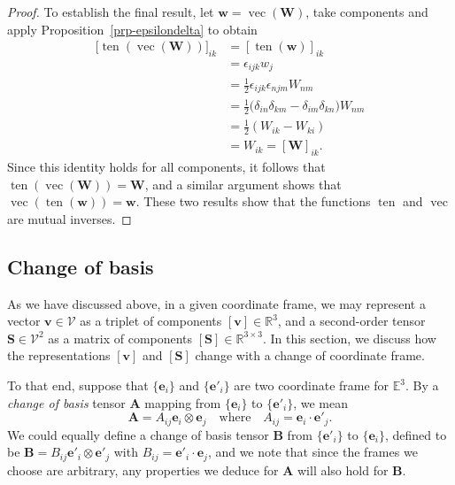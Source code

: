 \documentclass[
  letterpaper,
  DIV=11,
  numbers=noendperiod]{scrreprt}
\theoremstyle{plain}
\theoremstyle{remark}
\begin{document}
\begin{proof}
To establish the final result, let
\({\boldsymbol{w}}= {\operatorname{vec}}({\boldsymbol{W}})\), take
components and apply Proposition~\ref{prp-epsilondelta} to obtain
\begin{align*}
    \big[{\operatorname{ten}}({\operatorname{vec}}({\boldsymbol{W}}))\big]_{ik}
    &= [{\operatorname{ten}}({\boldsymbol{w}})]_{ik}\\
    &= \epsilon_{ijk}w_j\\
    &=\tfrac12\epsilon_{ijk}\epsilon_{njm}W_{nm}\\
    &=\tfrac12\big(\delta_{in}\delta_{km}-\delta_{im}\delta_{kn}\big)W_{nm}\\
    &=\tfrac12 (W_{ik}-W_{ki})\\
    &=W_{ik} = [{\boldsymbol{W}}]_{ik}.
\end{align*} Since this identity holds for all components, it follows
that
\({\operatorname{ten}}({\operatorname{vec}}({\boldsymbol{W}}))={\boldsymbol{W}}\),
and a similar argument shows that
\({\operatorname{vec}}({\operatorname{ten}}({\boldsymbol{w}}))={\boldsymbol{w}}\).
These two results show that the functions \({\operatorname{ten}}\) and
\({\operatorname{vec}}\) are mutual inverses.
\end{proof}

\subsection{Change of basis}\label{change-of-basis}

As we have discussed above, in a given coordinate frame, we may
represent a vector \({\boldsymbol{v}}\in{\mathcal{V}}\) as a triplet of
components \([{\boldsymbol{v}}]\in{\mathbb{R}}^3\), and a second-order
tensor \({\boldsymbol{S}}\in{\mathcal{V}}^2\) as a matrix of components
\([{\boldsymbol{S}}]\in{\mathbb{R}}^{3\times 3}\). In this section, we
discuss how the representations \([{\boldsymbol{v}}]\) and
\([{\boldsymbol{S}}]\) change with a change of coordinate frame.

To that end, suppose that \(\{{\boldsymbol{e}}_i\}\) and
\(\{{\boldsymbol{e}}'_i\}\) are two coordinate frame for
\({\mathbb{E}}^3\). By a \emph{change of basis} tensor
\({\boldsymbol{A}}\) mapping from \(\{{\boldsymbol{e}}_i\}\) to
\(\{{\boldsymbol{e}}'_i\}\), we mean
\[{\boldsymbol{A}}= A_{ij}{\boldsymbol{e}}_i\otimes {\boldsymbol{e}}_j\quad\text{where}\quad A_{ij} = {\boldsymbol{e}}_i\cdot{\boldsymbol{e}}'_j.\]
We could equally define a change of basis tensor \({\boldsymbol{B}}\)
from \(\{{\boldsymbol{e}}'_i\}\) to \(\{{\boldsymbol{e}}_i\}\), defined
to be
\({\boldsymbol{B}}= B_{ij}{\boldsymbol{e}}'_i\otimes{\boldsymbol{e}}'_j\)
with \(B_{ij} = {\boldsymbol{e}}'_i\cdot{\boldsymbol{e}}_j\), and we
note that since the frames we choose are arbitrary, any properties we
deduce for \({\boldsymbol{A}}\) will also hold for \({\boldsymbol{B}}\).
\end{document}
